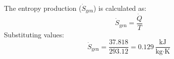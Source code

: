 The entropy production (\( \dot{S}_{\text{gen}} \)) is calculated as:  
\[
\dot{S}_{\text{gen}} = \frac{\dot{Q}}{T}
\]  
Substituting values:  
\[
\dot{S}_{\text{gen}} = \frac{37.818}{293.12} = 0.129 \, \frac{\text{kJ}}{\text{kg·K}}
\]